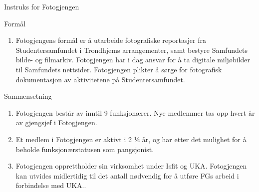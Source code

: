 \begin{instruks}{Instruks for Fotogjengen}{ }{ }

    \begin{instruksledd}{Formål}
        \begin{enumerate}
            \item Fotogjengens formål er å utarbeide fotografiske reportasjer fra Studentersamfundet i
                Trondhjems arrangementer, samt bestyre Samfundets bilde- og filmarkiv. Fotogjengen har i dag ansvar
                for å ta digitale miljøbilder til Samfundets nettsider. Fotogjengen plikter å sørge for fotografisk
                dokumentasjon av aktivitetene på Studentersamfundet.
        \end{enumerate}
    \end{instruksledd}
    
    \begin{instruksledd}{Sammensetning}
        \begin{enumerate} 
            \item Fotogjengen består av inntil 9 funksjonærer. Nye medlemmer tas opp hvert år av
                gjengsjef i Fotogjengen.
            \item Et medlem i Fotogjengen er aktivt i 2 ½ år, og har etter det mulighet for å beholde
                funksjonærstatusen som pangsjonist.
            \item Fotogjengen opprettholder sin virksomhet under Isfit og UKA. Fotogjengen kan utvides
                midlertidig til det antall nødvendig for å utføre FGs arbeid i forbindelse med UKA..
        \end{enumerate}
    \end{instruksledd}


\end{instruks}
